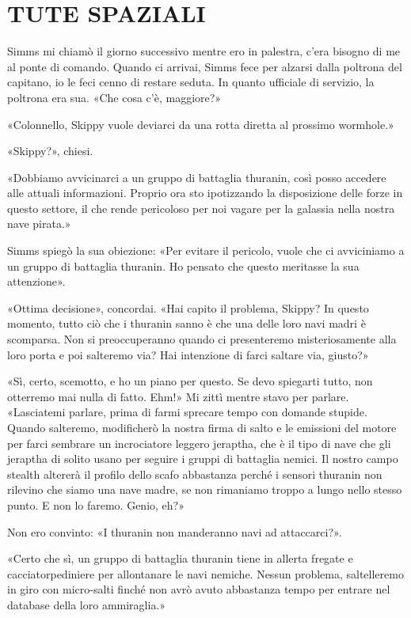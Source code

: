 \chapter{TUTE SPAZIALI}\label{tute-spaziali}

\hfill\break

Simms mi chiamò il giorno successivo mentre ero in palestra, c'era
bisogno di me al ponte di comando. Quando ci arrivai, Simms fece per
alzarsi dalla poltrona del capitano, io le feci cenno di restare seduta.
In quanto ufficiale di servizio, la poltrona era sua. «Che cosa c'è,
maggiore?»

«Colonnello, Skippy vuole deviarci da una rotta diretta al prossimo
wormhole.»

«Skippy?», chiesi.

«Dobbiamo avvicinarci a un gruppo di battaglia thuranin, così posso
accedere alle attuali informazioni. Proprio ora sto ipotizzando la
disposizione delle forze in questo settore, il che rende pericoloso per
noi vagare per la galassia nella nostra nave pirata.»

Simms spiegò la sua obiezione: «Per evitare il pericolo, vuole che ci
avviciniamo a un gruppo di battaglia thuranin. Ho pensato che questo
meritasse la sua attenzione».

«Ottima decisione», concordai. «Hai capito il problema, Skippy? In
questo momento, tutto ciò che i thuranin sanno è che una delle loro navi
madri è scomparsa. Non si preoccuperanno quando ci presenteremo
misteriosamente alla loro porta e poi salteremo via? Hai intenzione di
farci saltare via, giusto?»

«Sì, certo, scemotto, e ho un piano per questo. Se devo spiegarti tutto,
non otterremo mai nulla di fatto. Ehm!» Mi zittì mentre stavo per
parlare. «Lasciatemi parlare, prima di farmi sprecare tempo con domande
stupide. Quando salteremo, modificherò la nostra firma di salto e le
emissioni del motore per farci sembrare un incrociatore leggero
jeraptha, che è il tipo di nave che gli jeraptha di solito usano per
seguire i gruppi di battaglia nemici. Il nostro campo stealth altererà
il profilo dello scafo abbastanza perché i sensori thuranin non rilevino
che siamo una nave madre, se non rimaniamo troppo a lungo nello stesso
punto. E non lo faremo. Genio, eh?»

Non ero convinto: «I thuranin non manderanno navi ad attaccarci?».

«Certo che sì, un gruppo di battaglia thuranin tiene in allerta fregate
e cacciatorpediniere per allontanare le navi nemiche. Nessun problema,
saltelleremo in giro con micro-salti finché non avrò avuto abbastanza
tempo per entrare nel database della loro ammiraglia.»

